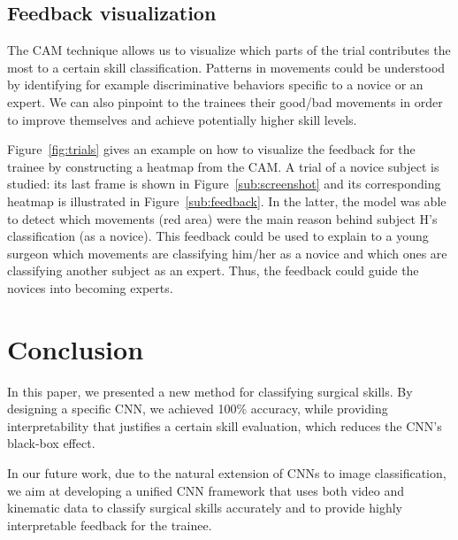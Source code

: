\documentclass{llncs}
\begin{document}
\subsection{Feedback visualization}\label{sec:feedback}
The CAM technique allows us to visualize which parts of the trial contributes the most to a certain skill classification. 
Patterns in movements could be understood by identifying for example discriminative behaviors specific to a novice or an expert.
We can also pinpoint to the trainees their good/bad movements in order to improve themselves and achieve potentially higher skill levels.  

Figure~\ref{fig:trials} gives an example on how to visualize the feedback for the trainee by constructing a heatmap from the CAM. 
A trial of a novice subject is studied: its last frame is shown in Figure~\ref{sub:screenshot} and its corresponding heatmap is illustrated in Figure~\ref{sub:feedback}. 
In the latter, the model was able to detect which movements (red area) were the main reason behind subject H's classification (as a novice). 
This feedback could be used to explain to a young surgeon which movements are classifying him/her as a novice and which ones are classifying another subject as an expert. 
Thus, the feedback could guide the novices into becoming experts.


\section{Conclusion}
In this paper, we presented a new method for classifying surgical skills. 
By designing a specific CNN, we achieved 100\% accuracy, while providing interpretability that justifies a certain skill evaluation, which reduces the CNN's black-box effect.

In our future work, due to the natural extension of CNNs to image classification, we aim at developing a unified CNN framework that uses both video and kinematic data to classify surgical skills accurately and to provide highly interpretable feedback for the trainee. 




\end{document}
